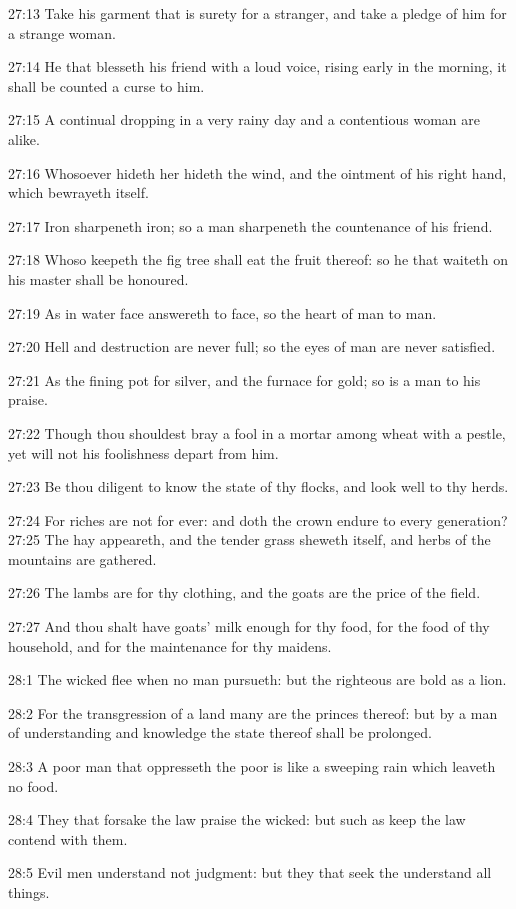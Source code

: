 27:13 Take his garment that is surety for a stranger, and take a
pledge of him for a strange woman.

27:14 He that blesseth his friend with a loud voice, rising early in
the morning, it shall be counted a curse to him.

27:15 A continual dropping in a very rainy day and a contentious woman
are alike.

27:16 Whosoever hideth her hideth the wind, and the ointment of his
right hand, which bewrayeth itself.

27:17 Iron sharpeneth iron; so a man sharpeneth the countenance of his
friend.

27:18 Whoso keepeth the fig tree shall eat the fruit thereof: so he
that waiteth on his master shall be honoured.

27:19 As in water face answereth to face, so the heart of man to man.

27:20 Hell and destruction are never full; so the eyes of man are
never satisfied.

27:21 As the fining pot for silver, and the furnace for gold; so is a
man to his praise.

27:22 Though thou shouldest bray a fool in a mortar among wheat with a
pestle, yet will not his foolishness depart from him.

27:23 Be thou diligent to know the state of thy flocks, and look well
to thy herds.

27:24 For riches are not for ever: and doth the crown endure to every
generation?  27:25 The hay appeareth, and the tender grass sheweth
itself, and herbs of the mountains are gathered.

27:26 The lambs are for thy clothing, and the goats are the price of
the field.

27:27 And thou shalt have goats' milk enough for thy food, for the
food of thy household, and for the maintenance for thy maidens.

28:1 The wicked flee when no man pursueth: but the righteous are bold
as a lion.

28:2 For the transgression of a land many are the princes thereof: but
by a man of understanding and knowledge the state thereof shall be
prolonged.

28:3 A poor man that oppresseth the poor is like a sweeping rain which
leaveth no food.

28:4 They that forsake the law praise the wicked: but such as keep the
law contend with them.

28:5 Evil men understand not judgment: but they that seek the \LORD
understand all things.

